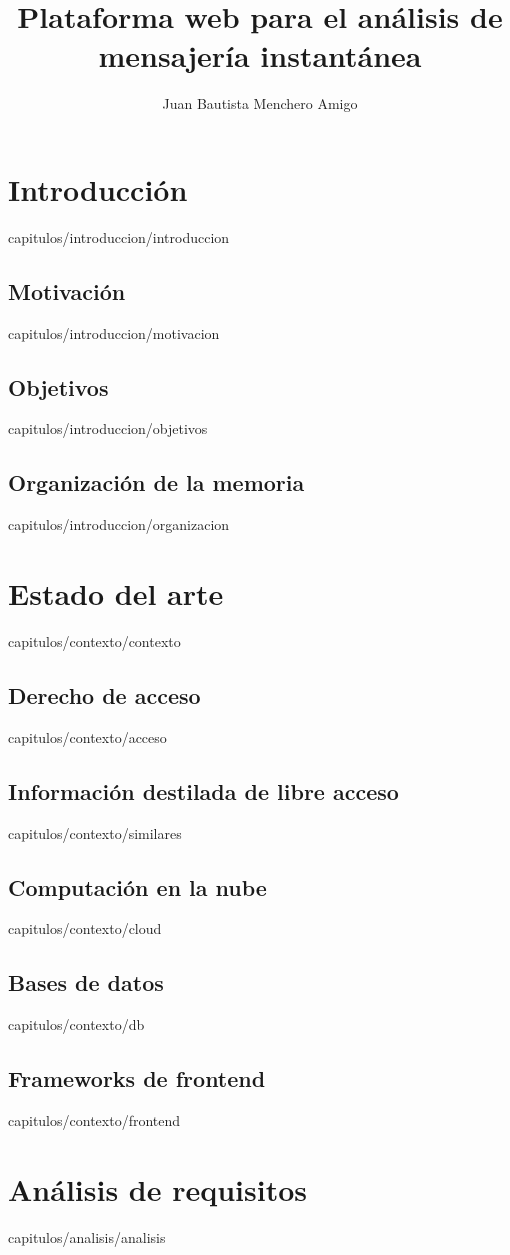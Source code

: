 \documentclass[epsbased,copyright,final,printable,covers,extendedindex,firstnumbered,tfg,gnuplot]{thesis}
\title{Plataforma web para el análisis de mensajería instantánea}
\author{Juan Bautista Menchero Amigo}
\begin{document}
\chapter{Introducción\label{CAP:INTRODUCCION}}{capitulos/introduccion/introduccion}
  \section{Motivación\label{SEC:MOTIVACION}}{capitulos/introduccion/motivacion}
  \section{Objetivos\label{SEC:OBJETIVOS}}{capitulos/introduccion/objetivos}
  \section{Organización de la memoria\label{SEC:ORGANIZACION}}{capitulos/introduccion/organizacion}

\chapter{Estado del arte\label{CAP:CONTEXTO}}{capitulos/contexto/contexto}
  \section{Derecho de acceso\label{SEC:ACCESO}}{capitulos/contexto/acceso}
  \section{Información destilada de libre acceso\label{SEC:SIMILARES}}{capitulos/contexto/similares}
  \section{Computación en la nube\label{SEC:CLOUD}}{capitulos/contexto/cloud}
  \section{Bases de datos\label{SEC:DB}}{capitulos/contexto/db}
  \section{Frameworks de frontend\label{SEC:FRONTEND}}{capitulos/contexto/frontend}

\chapter{Análisis de requisitos\label{CAP:ANALISIS}}{capitulos/analisis/analisis}
\end{document}

